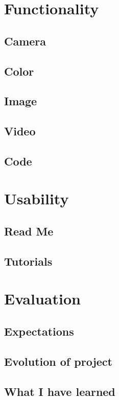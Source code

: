 \documentclass[a4paper]{report}
\begin{document}
\chapter{Functionality}
\section{Camera}
\section{Color}
\section{Image}
\section{Video}
\section{Code}

\chapter{Usability}
\section{Read Me}
\section{Tutorials}

\chapter{Evaluation}
\section{Expectations}
\section{Evolution of project}
\section{What I have learned}




\end{document}
